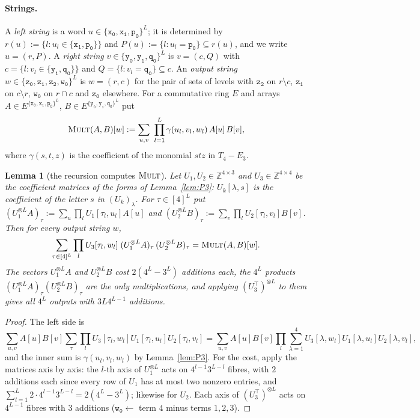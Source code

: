 \documentclass[11pt]{article}
\newtheorem{lemma}[theorem]{Lemma}
\theoremstyle{definition}
\theoremstyle{remark}
\newcommand{\Z}{\mathbb{Z}}
\newcommand{\Mult}{\textnormal{\textsc{Mult}}}
\newcommand{\tl}[1]{\mathtt{#1}}
\begin{document}
\paragraph{Strings.} A \emph{left string} is a word $u\in\{\tl{x_0},\tl{x_1},\tl{p_0}\}^L$; it is determined by $r(u):=\{l:u_l\in\{\tl{x_1},\tl{p_0}\}\}$ and $P(u):=\{l:u_l=\tl{p_0}\}\subseteq r(u)$, and we write $u=(r,P)$. A \emph{right string} $v\in\{\tl{y_0},\tl{y_1},\tl{q_0}\}^L$ is $v=(c,Q)$ with $c=\{l:v_l\in\{\tl{y_1},\tl{q_0}\}\}$ and $Q=\{l:v_l=\tl{q_0}\}\subseteq c$. An \emph{output string} $w\in\{\tl{z_0},\tl{z_1},\tl{z_2},\tl{w_0}\}^L$ is $w=(r,c)$ for the pair of sets of levels with $\tl{z_2}$ on $r\setminus c$, $\tl{z_1}$ on $c\setminus r$, $\tl{w_0}$ on $r\cap c$ and $\tl{z_0}$ elsewhere. For a commutative ring $E$ and arrays $A\in E^{\{\tl{x_0},\tl{x_1},\tl{p_0}\}^L}$, $B\in E^{\{\tl{y_0},\tl{y_1},\tl{q_0}\}^L}$ put
\[
\Mult(A,B)[w]:=\sum_{u,v}\ \prod_{l=1}^L\gamma(u_l,v_l,w_l)\,A[u]\,B[v],
\]
where $\gamma(s,t,z)$ is the coefficient of the monomial $stz$ in $T_4-E_3$.

\begin{lemma}[the recursion computes $\Mult$]\label{lem:rec}
Let $U_1,U_2\in\Z^{4\times3}$ and $U_3\in\Z^{4\times4}$ be the coefficient matrices of the forms of Lemma~\ref{lem:P3}: $U_k[\lambda,s]$ is the coefficient of the letter $s$ in $(U_k)_\lambda$. For $\tau\in[4]^L$ put $(U_1^{\otimes L}A)_\tau:=\sum_u\prod_lU_1[\tau_l,u_l]A[u]$ and $(U_2^{\otimes L}B)_\tau:=\sum_v\prod_lU_2[\tau_l,v_l]B[v]$. Then for every output string $w$,
\[
\sum_{\tau\in[4]^L}\prod_lU_3[\tau_l,w_l]\;(U_1^{\otimes L}A)_\tau\,(U_2^{\otimes L}B)_\tau=\Mult(A,B)[w].
\]
The vectors $U_1^{\otimes L}A$ and $U_2^{\otimes L}B$ cost $2(4^L-3^L)$ additions each, the $4^L$ products $(U_1^{\otimes L}A)_\tau(U_2^{\otimes L}B)_\tau$ are the only multiplications, and applying $(U_3^{\top})^{\otimes L}$ to them gives all $4^L$ outputs with $3L4^{L-1}$ additions.
\end{lemma}

\begin{proof}
The left side is
\[
\sum_{u,v}A[u]B[v]\sum_\tau\prod_lU_3[\tau_l,w_l]U_1[\tau_l,u_l]U_2[\tau_l,v_l]=\sum_{u,v}A[u]B[v]\prod_l\sum_{\lambda=1}^4U_3[\lambda,w_l]U_1[\lambda,u_l]U_2[\lambda,v_l],
\]
and the inner sum is $\gamma(u_l,v_l,w_l)$ by Lemma~\ref{lem:P3}. For the cost, apply the matrices axis by axis: the $l$-th axis of $U_1^{\otimes L}$ acts on $4^{l-1}3^{L-l}$ fibres, with $2$ additions each since every row of $U_1$ has at most two nonzero entries, and $\sum_{l=1}^L2\cdot4^{l-1}3^{L-l}=2(4^L-3^L)$; likewise for $U_2$. Each axis of $(U_3^\top)^{\otimes L}$ acts on $4^{L-1}$ fibres with $3$ additions ($\tl{w_0}\leftarrow$ term $4$ minus terms $1,2,3$).
\end{proof}
\end{document}
